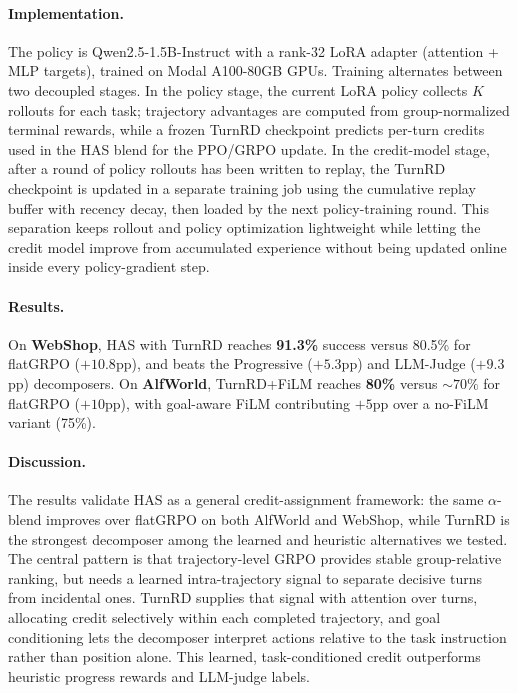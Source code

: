 \documentclass{article}
\begin{document}
\begin{titlepage}
\paragraph{Implementation.}
The policy is Qwen2.5-1.5B-Instruct with a rank-32 LoRA adapter (attention + MLP targets),
trained on Modal A100-80GB GPUs. Training alternates between two decoupled stages. In the
policy stage, the current LoRA policy collects $K$ rollouts for each task; trajectory
advantages are computed from group-normalized terminal rewards, while a frozen TurnRD
checkpoint predicts per-turn credits used in the HAS blend for the PPO/GRPO update. In the
credit-model stage, after a round of policy rollouts has been written to replay, the TurnRD
checkpoint is updated in a separate training job using the cumulative replay buffer with
recency decay, then loaded by the next policy-training round. This separation keeps rollout
and policy optimization lightweight while letting the credit model improve from accumulated
experience without being updated online inside every policy-gradient step.

\paragraph{Results.}
On \textbf{WebShop}, HAS with TurnRD reaches \textbf{91.3\%} success versus 80.5\% for
flatGRPO ($+10.8$pp), and beats the Progressive ($+5.3$pp) and LLM-Judge ($+9.3$pp)
decomposers.
On \textbf{AlfWorld}, TurnRD+FiLM reaches \textbf{80\%} versus ${\sim}70\%$ for flatGRPO
($+10$pp), with goal-aware FiLM contributing $+5$pp over a no-FiLM variant (75\%).

\paragraph{Discussion.}
The results validate HAS as a general credit-assignment framework: the same $\alpha$-blend
improves over flatGRPO on both AlfWorld and WebShop, while TurnRD is the strongest decomposer
among the learned and heuristic alternatives we tested. The central pattern is that
trajectory-level GRPO provides stable group-relative ranking, but needs a learned
intra-trajectory signal to separate decisive turns from incidental ones. TurnRD supplies that
signal with attention over turns, allocating credit selectively within each completed
trajectory, and goal conditioning lets the decomposer interpret actions relative to the task
instruction rather than position alone. This learned, task-conditioned credit outperforms
heuristic progress rewards and LLM-judge labels.


\end{titlepage}
\end{document}
